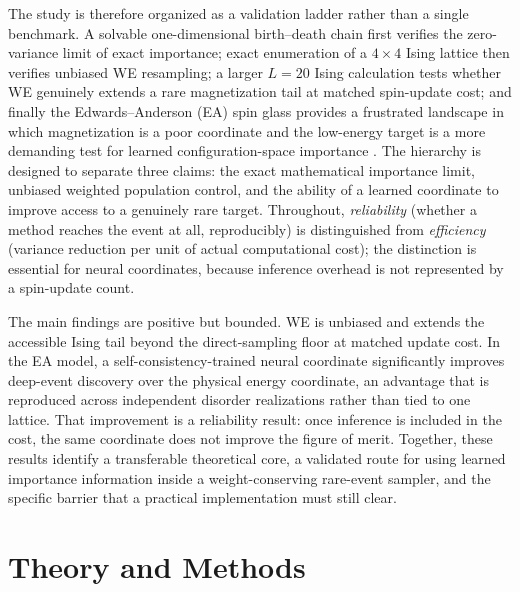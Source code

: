 \documentclass[a4paper,fleqn]{cas-sc}
\begin{document}
The study is therefore organized as a validation ladder rather than a single benchmark. A
solvable one-dimensional birth--death chain first verifies the zero-variance limit of exact
importance; exact enumeration of a $4\times4$ Ising lattice then verifies unbiased WE
resampling; a larger $L=20$ Ising calculation tests whether WE genuinely extends a rare
magnetization tail at matched spin-update cost; and finally the Edwards--Anderson (EA) spin
glass provides a frustrated landscape in which magnetization is a poor coordinate and the
low-energy target is a more demanding test for learned configuration-space importance
\citep{ising1925,onsager1944,edwards1975,binder1986}. The hierarchy is designed to separate
three claims: the exact mathematical importance limit, unbiased weighted population control,
and the ability of a learned coordinate to improve access to a genuinely rare target.
Throughout, \emph{reliability} (whether a method reaches the event at all, reproducibly) is
distinguished from \emph{efficiency} (variance reduction per unit of actual computational
cost); the distinction is essential for neural coordinates, because inference overhead is not
represented by a spin-update count.

The main findings are positive but bounded. WE is unbiased and extends the accessible Ising
tail beyond the direct-sampling floor at matched update cost. In the EA model, a
self-consistency-trained neural coordinate significantly improves deep-event discovery over
the physical energy coordinate, an advantage that is reproduced across independent disorder
realizations rather than tied to one lattice. That improvement is a reliability result: once
inference is included in the cost, the same coordinate does not improve the figure of merit.
Together,
these results identify a transferable theoretical core, a validated route for using learned
importance information inside a weight-conserving rare-event sampler, and the specific
barrier that a practical implementation must still clear.

\FloatBarrier

\section{Theory and Methods}\label{sec:methods}
\end{document}
